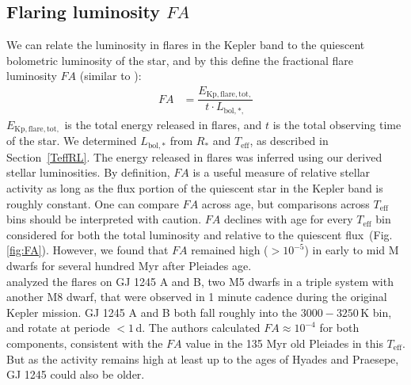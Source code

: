 \documentclass{aa}
\begin{document}
\subsection{Flaring luminosity $FA$}
\label{sec:fa}
We can relate the luminosity in flares in the Kepler band to the quiescent bolometric luminosity of the star, and by this define the fractional flare luminosity $FA$ (similar to ):
\begin{align}
\label{eq:FA}
FA&=\dfrac{E_\mathrm{Kp,flare,tot,}}{t\cdot L_{\mathrm{bol,*,}}}
\end{align}
$E_\mathrm{Kp,flare,tot,}$ is the total energy released in flares, and $t$ is the total observing time of the star.
We determined $L_\mathrm{bol,*}$ from $R_*$ and $T_\mathrm{eff}$, as described in Section~\ref{TeffRL}. The energy released in flares was inferred using our derived stellar luminosities. By definition, $FA$ is a useful measure of relative stellar activity as long as the flux portion of the quiescent star in the Kepler band is roughly constant. One can compare $FA$ across age, but comparisons across $T_\mathrm{eff}$ bins should be interpreted with caution. $FA$ declines with age for every $T_\mathrm{eff}$ bin considered for both the total luminosity and relative to the quiescent flux~(Fig. \ref{fig:FA}). However, we found that $FA$ remained high ($>10^{-5}$) in early to mid M dwarfs for several hundred Myr after Pleiades age. 
\\ 
\citet{lurie2015} analyzed the flares on GJ 1245 A and B, two M5 dwarfs in a triple system with another M8 dwarf, that were observed in 1 minute cadence during the original Kepler mission. GJ 1245 A and B both fall roughly into the $3000-3250\,$K bin, and rotate at periode $<1$\,d. The authors calculated $FA\approx 10^{-4}$ for both components, consistent with the $FA$ value in the 135 Myr old Pleiades in this $T_\mathrm{eff}$. But as the activity remains high at least up to the ages of Hyades and Praesepe, GJ 1245 could also be older.
\end{document}
